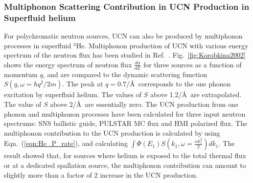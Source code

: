 


 \subsubsection{Multiphonon Scattering Contribution in UCN Production
   in Superfluid helium~\cite{Korobkina2002,Schmidt2009}}
 For polychromatic neutron sources, UCN can also be produced by
 multiphonon processes in superfluid $^4$He. Multiphonon production of
 UCN with various energy spectrum of the neutron flux has been studied
 in Ref.~\cite{Korobkina2002}.  Fig.~\ref{fig:Korobkina2002} shows the
 energy spectrum of neutron flux $\frac{d\phi}{dE}$ for three sources
 as a function of momentum $q$, and are compared to the dynamic
 scattering function $S(q,\omega=\hbar q^2/2m)$. The peak at
 $q=0.7$/\AA~corresponds to the one phonon excitation by superfluid
 helium. The values of $S$ above 1.2/\AA~are extrapolated. The value
 of $S$ above 2/\AA~are essentially zero.  The UCN production from one
 phonon and multiphonon processes have been calculated for three input
 neutron spectrums: SNS ballistic guide, PULSTAR MC flux and HMI
 polarized flux.  The multiphonon contribution to the UCN production
 is calculated by using Eqn.~(\ref{eqn:He_P_rate}), and calculating
 $\int \Phi(E_1)S(k_1,\omega=\frac{\alpha k_1^2}{2}) dk_1$.  The
 result showed that, for sources where helium is exposed to the total
 thermal flux or at a dedicated spallation source, the multiphonon
 contribution can amount to slightly more than a factor of 2 increase
 in the UCN production.






